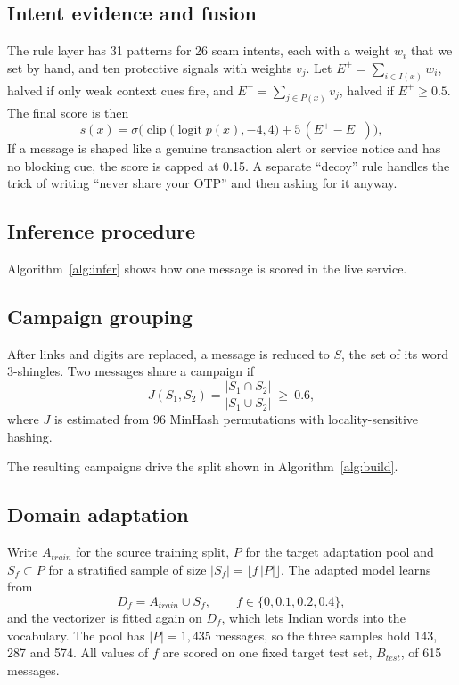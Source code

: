\subsection{Intent evidence and fusion}\label{sec:fusion}
The rule layer has 31 patterns for 26 scam intents, each with a weight $w_i$ that we set by hand, and ten protective signals with weights $v_j$. Let $E^{+}=\sum_{i\in I(x)}w_i$, halved if only weak context cues fire, and $E^{-}=\sum_{j\in P(x)}v_j$, halved if $E^{+}\ge 0.5$. The final score is then
\begin{equation}
s(x)=\sigma\!\Big(\operatorname{clip}\big(\operatorname{logit}p(x),-4,4\big)+5\,(E^{+}-E^{-})\Big),
\end{equation}
If a message is shaped like a genuine transaction alert or service notice and has no blocking cue, the score is capped at 0.15. A separate ``decoy'' rule handles the trick of writing ``never share your OTP'' and then asking for it anyway.

\subsection{Inference procedure}
Algorithm~\ref{alg:infer} shows how one message is scored in the live service.



\subsection{Campaign grouping}
After links and digits are replaced, a message is reduced to $S$, the set of its word 3-shingles. Two messages share a campaign if
\begin{equation}
J(S_1,S_2)=\frac{|S_1\cap S_2|}{|S_1\cup S_2|}\ \ge\ 0.6,
\end{equation}
where $J$ is estimated from 96 MinHash permutations with locality-sensitive hashing.

The resulting campaigns drive the split shown in Algorithm~\ref{alg:build}.

\subsection{Domain adaptation}\label{sec:xdomain}
Write $A_{train}$ for the source training split, $P$ for the target adaptation pool and $S_f\subset P$ for a stratified sample of size $|S_f|=\lfloor f\,|P|\rfloor$. The adapted model learns from
\begin{equation}
D_f=A_{train}\cup S_f,\qquad f\in\{0, 0.1, 0.2, 0.4\},
\end{equation}
and the vectorizer is fitted again on $D_f$, which lets Indian words into the vocabulary. The pool has $|P|=1{,}435$ messages, so the three samples hold 143, 287 and 574. All values of $f$ are scored on one fixed target test set, $B_{test}$, of 615 messages.

